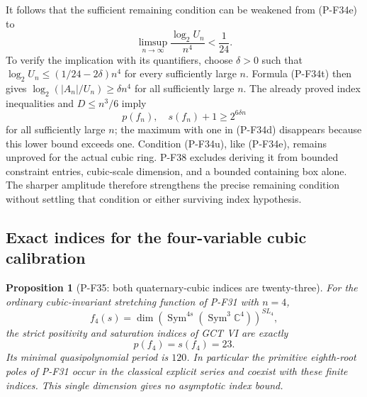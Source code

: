\documentclass[11pt,a4paper]{article}
\newtheorem{proposition}{Proposition}[section]
\begin{document}
It follows that the sufficient remaining condition can be
weakened from (P-F34e) to
\[
 \limsup_{n\to\infty}\frac{\log_2 U_n}{n^4}<\frac1{24}.
 \tag{P-F34u}
\]
To verify the implication with its quantifiers, choose
$\delta>0$ such that
$\log_2 U_n\le(1/24-2\delta)n^4$ for every sufficiently
large $n$. Formula (P-F34t) then gives
$\log_2(|A_n|/U_n)\ge\delta n^4$ for all sufficiently
large $n$. The already proved index inequalities and
$D\le n^3/6$ imply
\[
                   p(f_n),\quad s(f_n)+1\ge2^{6\delta n}
\]
for all sufficiently large $n$; the maximum with one in
(P-F34d) disappears because this lower bound exceeds one.
Condition (P-F34u), like (P-F34e), remains unproved for the
actual cubic ring. P-F38 excludes deriving it from bounded
constraint entries, cubic-scale dimension, and a bounded
containing box alone. The sharper amplitude therefore
strengthens the precise remaining condition without settling
that condition or either surviving index hypothesis.


\subsection{Exact indices for the four-variable cubic calibration}

\begin{proposition}[P-F35: both quaternary-cubic indices are twenty-three]
\label{prop:quaternaryindices}
For the ordinary cubic-invariant stretching function of P-F31 with
$n=4$,
\[
 f_4(s)=\dim\left(\operatorname{Sym}^{4s}
                  (\operatorname{Sym}^3\mathbb C^4)\right)^{SL_4},
\]
the strict positivity and saturation indices of GCT VI are exactly
\[
                          p(f_4)=s(f_4)=23.
 \tag{P-F35a}
\]
Its minimal quasipolynomial period is $120$. In particular the
primitive eighth-root poles of P-F31 occur in the classical
explicit series and coexist with these finite indices. This
single dimension gives no asymptotic index bound.
\end{proposition}
\end{document}
